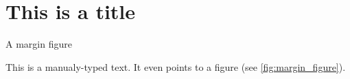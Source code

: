 \section{This is a title}\label{sec:title}
\lipsum[2-2]

\begin{marginfigure}
    \begin{center}
    \end{center}
    \caption{A margin figure}
    \label{fig:margin_figure}
\end{marginfigure}

This is a manualy-typed text. It even points to a figure (see \autoref{fig:margin_figure}).
